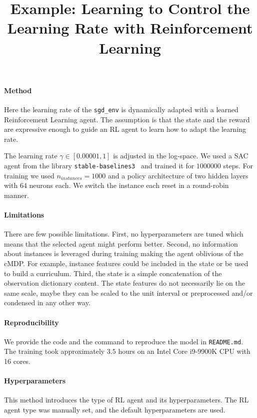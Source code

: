 \documentclass[11pt, final]{article}
\title{Example: Learning to Control the Learning Rate with Reinforcement Learning}
\author[1,2]{\nameemail{Carolin Benjamins}{}}
\affil[1]{Leibniz University Hannover}
\affil[2]{\url{https://www.AutoML.org}}
\begin{document}
\maketitle

\paragraph{Method}
Here the learning rate of the \texttt{sgd\_env} is dynamically adapted with a learned
Reinforcement Learning agent.
The assumption is that the state and the reward are expressive enough to guide an RL agent
to learn how to adapt the learning rate.

The learning rate $\gamma \in [0.00001, 1]$ is adjusted in the log-space.
We used a SAC~\cite{haarnoja-icml2018} agent from the library \texttt{stable-baselines3}~\cite{stable-baselines3}
and trained it for $1000000$ steps.
For training we used $n_{instances} = 1000$ and a policy architecture of two hidden layers
with $64$ neurons each.
We switch the instance each reset in a round-robin manner.

\paragraph{Limitations}
There are few possible limitations.
First, no hyperparameters are tuned which means that the selected agent might perform better.
Second, no information about instances is leveraged during training making the agent oblivious of the cMDP.
For example, instance features could be included in the state or be used to build a curriculum.
Third, the state is a simple concatenation of the observation dictionary content.
The state features do not necessarily lie on the same scale, maybe they can be scaled to the unit interval or
preprocessed and/or condensed in any other way.

\paragraph{Reproducibility}
We provide the code and the command to reproduce the model in \texttt{README.md}.
The training took approximately $3.5$ hours on an Intel Core i9-9900K CPU with 16 cores.

\paragraph{Hyperparameters}
This method introduces the type of RL agent and its hyperparameters.
The RL agent type was manually set, and the default hyperparameters are used.



\end{document}
